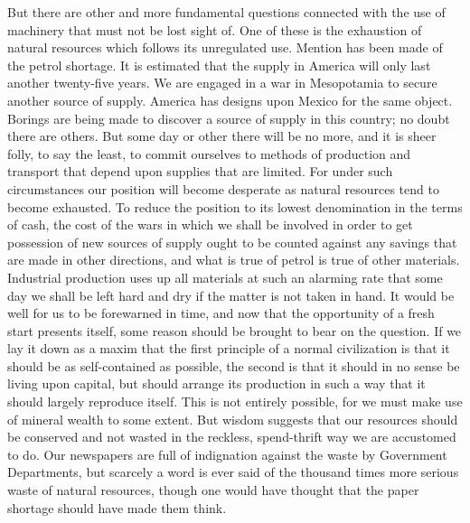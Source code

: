 \documentclass{book}
\begin{document}
But there are other and more fundamental questions connected with the use of machinery that must not be lost sight of. One of these is the exhaustion of natural resources which follows its unregulated use. Mention has been made of the petrol shortage. It is estimated that the supply in America will only last another twenty-five years. We are engaged in a war in Mesopotamia to secure another source of supply. America has designs upon Mexico for the same object. Borings are being made to discover a source of supply in this country; no doubt there are others. But some day or other there will be no more, and it is sheer folly, to say the least, to commit ourselves to methods of production and transport that depend upon supplies that are limited. For under such circumstances our position will become desperate as natural resources tend to become exhausted. To reduce the position to its lowest denomination in the terms of cash, the cost of the wars in which we shall be involved in order to get possession of new sources of supply ought to be counted against any savings that are made in other directions, and what is true of petrol is true of other materials. Industrial production uses up all materials at such an alarming rate that some day we shall be left hard and dry if the matter is not taken in hand. It would be well for us to be forewarned in time, and now that the opportunity of a fresh start presents itself, some reason should be brought to bear on the question. If we lay it down as a maxim that the first principle of a normal civilization is that it should be as self-contained as possible, the second is that it should in no sense be living upon capital, but should arrange its production in such a way that it should largely reproduce itself. This is not entirely possible, for we must make use of mineral wealth to some extent. But wisdom suggests that our resources should be conserved and not wasted in the reckless, spend-thrift way we are accustomed to do. Our newspapers are full of indignation against the waste by Government Departments, but scarcely a word is ever said of the thousand times more serious waste of natural resources, though one would have thought that the paper shortage should have made them think.
\end{document}

